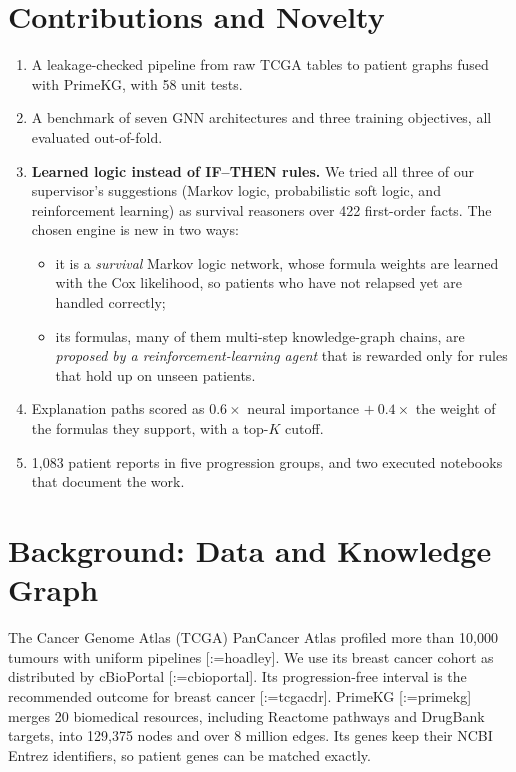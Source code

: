 \documentclass{mnnit}
\makeatletter
\newcommand{\rc}[1]{[\def\rc@sep{}\@for\rc@key:=#1\do{\rc@sep\ref{ref:\rc@key}\def\rc@sep{, }}]}
\makeatother
\begin{document}
\section{Contributions and Novelty}
\begin{enumerate}
  \item A leakage-checked pipeline from raw TCGA tables to patient graphs fused with PrimeKG, with 58 unit tests.
  \item A benchmark of seven GNN architectures and three training objectives, all evaluated out-of-fold.
  \item \textbf{Learned logic instead of IF--THEN rules.} We tried all three of our supervisor's suggestions (Markov
        logic, probabilistic soft logic, and reinforcement learning) as survival reasoners over 422 first-order facts.
        The chosen engine is new in two ways:
        \begin{itemize}
          \item it is a \emph{survival} Markov logic network, whose formula weights are learned with the Cox
                likelihood, so patients who have not relapsed yet are handled correctly;
          \item its formulas, many of them multi-step knowledge-graph chains, are \emph{proposed by a
                reinforcement-learning agent} that is rewarded only for rules that hold up on unseen patients.
        \end{itemize}
  \item Explanation paths scored as $0.6\times$ neural importance $+\ 0.4\times$ the weight of the formulas they
        support, with a top-$K$ cutoff.
  \item 1,083 patient reports in five progression groups, and two executed notebooks that document the work.
\end{enumerate}

\section{Background: Data and Knowledge Graph}
The Cancer Genome Atlas (TCGA) PanCancer Atlas profiled more than 10,000 tumours with uniform pipelines \rc{hoadley}.
We use its breast cancer cohort as distributed by cBioPortal \rc{cbioportal}. Its progression-free interval is the
recommended outcome for breast cancer \rc{tcgacdr}. PrimeKG \rc{primekg} merges 20 biomedical resources, including
Reactome pathways and DrugBank targets, into 129,375 nodes and over 8 million edges. Its genes keep their NCBI
Entrez identifiers, so patient genes can be matched exactly.
\end{document}
